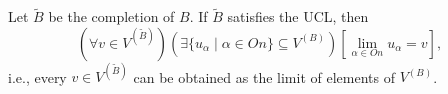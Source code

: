 Let $\tilde{B}$ be the completion of $B$. If $\tilde{B}$ satisfies the UCL, then
$$(\forall v \in V^{(\tilde{B})})(\exists \{u_\alpha \mid \alpha \in On\} \subseteq V^{(B)})[\lim_{\alpha \in On} u_\alpha = v],$$
i.e., every $v \in V^{(\tilde{B})}$ can be obtained as the limit of elements of $V^{(B)}$.
